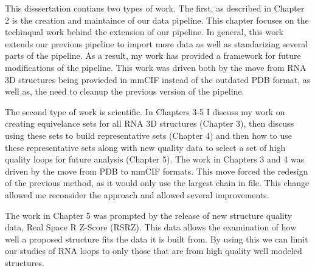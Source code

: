 This disssertation contians two types of work. The first, as described in
Chapter 2 is the creation and maintaince of our data pipeline. This chapter
focuses on the techinqual work behind the extension of our pipeline. In general,
this work extends our previous pipeline to import more data as well as
standarizing several parts of the pipeline. As a result, my work has provided a
framework for future modifications of the pipeline. This work was driven both by
the move from RNA 3D structures being provieded in mmCIF instead of the outdated
PDB format, as well as, the need to cleanup the previous version of the
pipeline.

The second type of work is scientific. In Chapters 3-5 I discuss my work on
creating equivelance sets for all RNA 3D structures (Chapter 3), then discuss
using these sets to build representative sets (Chapter 4) and then how to use
these representative sets along with new quality data to select a set of high
quality loops for future analysis (Chapter 5). The work in Chapters 3 and 4 was
driven by the move from PDB to mmCIF formats. This move forced the redesign of
the previous method, as it would only use the largest chain in file. This change
allowed me reconsider the approach and allowed several improvements. 

The work in Chapter 5 was prompted by the release of new structure quality data,
Real Space R Z-Score (RSRZ). This data allows the examination of how well a
proposed structure fits the data it is built from. By using this we can limit
our studies of RNA loops to only those that are from high quality well modeled
structures. 
